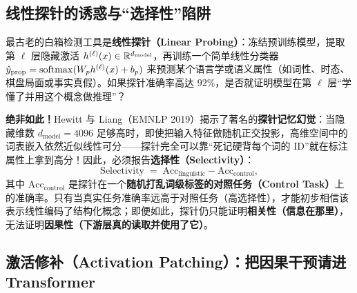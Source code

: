 \subsection{线性探针的诱惑与“选择性”陷阱}

最古老的白箱检测工具是\textbf{线性探针（Linear Probing）}：冻结预训练模型，提取第 $\ell$ 层隐藏激活 $h^{(\ell)}(x) \in \mathbb{R}^{d_{\text{model}}}$，再训练一个简单线性分类器 $\hat{y}_{\text{prop}} = \operatorname{softmax}(W_p h^{(\ell)}(x) + b_p)$ 来预测某个语言学或语义属性（如词性、时态、棋盘局面或事实真假）。如果探针准确率高达 $92\%$，是否就证明模型在第 $\ell$ 层“学懂了并用这个概念做推理”？

\textbf{绝非如此！}Hewitt 与 Liang（EMNLP 2019）揭示了著名的\textbf{探针记忆幻觉}：当隐藏维数 $d_{\text{model}} = 4096$ 足够高时，即使把输入特征做随机正交投影，高维空间中的词表嵌入依然近似线性可分——探针完全可以靠“死记硬背每个词的 ID”就在标注属性上拿到高分！因此，必须报告\textbf{选择性（Selectivity）}：
\[
  \mathrm{Selectivity} \;=\; \mathrm{Acc}_{\text{linguistic}} - \mathrm{Acc}_{\text{control}},
\]
其中 $\mathrm{Acc}_{\text{control}}$ 是探针在一个\textbf{随机打乱词级标签的对照任务（Control Task）}上的准确率。只有当真实任务准确率远高于对照任务（高选择性），才能初步相信该表示线性编码了结构化概念；即便如此，探针仍只能证明\textbf{相关性（信息在那里）}，无法证明\textbf{因果性（下游层真的读取并使用了它）}。

\subsection{激活修补（Activation Patching）：把因果干预请进 Transformer}

